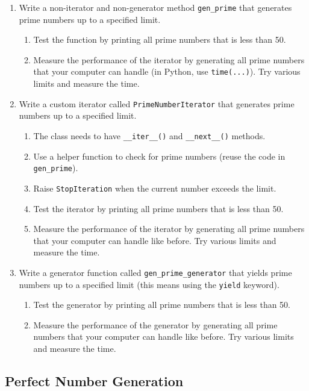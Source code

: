 \documentclass[oneside,11pt,dvipsnames]{book}
\newcommand{\code}[1]{\texttt{#1}}
\begin{document}
\begin{enumerate}
    
    \item Write a non-iterator and non-generator method \code{gen\_prime} that generates prime numbers up to a specified limit.
    \begin{enumerate}
    \item Test the function by printing all prime numbers that is less than 50.
    \item Measure the performance of the iterator by generating all prime numbers that your computer can handle (in Python, use \code{time(...)}).  Try various limits and measure the time.
    \end{enumerate}

\item Write a custom iterator called \code{PrimeNumberIterator} that generates prime numbers up to a specified limit.
\begin{enumerate}
    \item The class needs to have \code{\_\_iter\_\_()} and \code{\_\_next\_\_()} methods.
    \item Use a helper function to check for prime numbers (reuse the code in \code{gen\_prime}).
    \item Raise \code{StopIteration} when the current number exceeds the limit.
    \item Test the iterator by printing all prime numbers that is less than 50.
    \item Measure the performance of the iterator by generating all prime numbers that your computer can handle like before.  Try various limits and measure the time.
\end{enumerate}
\item Write a generator function called \code{gen\_prime\_generator} that yields prime numbers up to a specified limit (this means using the \code{yield} keyword).
\begin{enumerate}
    \item Test the generator by printing all prime numbers that is less than 50.
    \item Measure the performance of the generator by generating all prime numbers that your computer can handle like before.  Try various limits and measure the time.
\end{enumerate}
\end{enumerate}
\subsection{Perfect Number Generation}\label{exercise:perfect-number}
\end{document}
